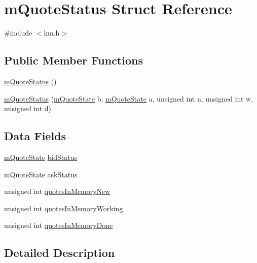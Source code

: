 \hypertarget{struct_k_1_1m_quote_status}{}\section{m\+Quote\+Status Struct Reference}
\label{struct_k_1_1m_quote_status}


{\ttfamily \#include $<$km.\+h$>$}

\subsection*{Public Member Functions}
\begin{DoxyCompactItemize}
\item 
\hyperlink{struct_k_1_1m_quote_status_a0a7505258908838195c0b17cf00bd9f9}{m\+Quote\+Status} ()
\item 
\hyperlink{struct_k_1_1m_quote_status_aed8b89bf13b47ecc96f2e513244d1dfa}{m\+Quote\+Status} (\hyperlink{namespace_k_a76b6774ff9252e574d375a353ecf6736}{m\+Quote\+State} b, \hyperlink{namespace_k_a76b6774ff9252e574d375a353ecf6736}{m\+Quote\+State} a, unsigned int n, unsigned int w, unsigned int d)
\end{DoxyCompactItemize}
\subsection*{Data Fields}
\begin{DoxyCompactItemize}
\item 
\hyperlink{namespace_k_a76b6774ff9252e574d375a353ecf6736}{m\+Quote\+State} \hyperlink{struct_k_1_1m_quote_status_a32c042e88ff93f679a53d90d8c5f0f4a}{bid\+Status}
\item 
\hyperlink{namespace_k_a76b6774ff9252e574d375a353ecf6736}{m\+Quote\+State} \hyperlink{struct_k_1_1m_quote_status_a337d23be0a3a24d260917d7237ab226c}{ask\+Status}
\item 
unsigned int \hyperlink{struct_k_1_1m_quote_status_a28f5330130eff801278c9e5ed7e9d206}{quotes\+In\+Memory\+New}
\item 
unsigned int \hyperlink{struct_k_1_1m_quote_status_a806fde35f6fa8e059f8d35ab6621de2c}{quotes\+In\+Memory\+Working}
\item 
unsigned int \hyperlink{struct_k_1_1m_quote_status_a6aaa53c58be053ff456a485a904539e4}{quotes\+In\+Memory\+Done}
\end{DoxyCompactItemize}


\subsection{Detailed Description}


